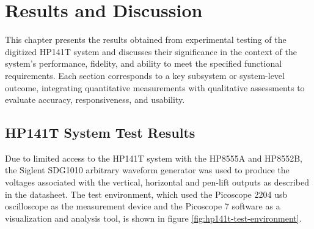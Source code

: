 \documentclass[class=report,11pt,crop=false]{standalone}
\begin{document}
	\chapter{Results and Discussion}
	
	This chapter presents the results obtained from experimental testing of the digitized HP141T system and discusses their significance in the context of the system's performance, fidelity, and ability to meet the specified functional requirements. Each section corresponds to a key subsystem or system-level outcome, integrating quantitative measurements with qualitative assessments to evaluate accuracy, responsiveness, and usability.
	
	\section{HP141T System Test Results}
	
	Due to limited access to the HP141T system with the HP8555A and HP8552B, the Siglent SDG1010 arbitrary waveform generator was used to produce the voltages associated with the vertical, horizontal and pen-lift outputs as described in the datasheet. The test environment, which used the Picoscope 2204 \acrshort{usb} oscilloscope as the measurement device and the Picoscope 7 software as a visualization and analysis tool, is shown in figure \ref{fig:hp141t-test-environment}.
	
\end{document}
